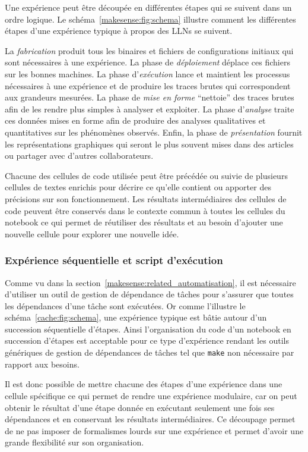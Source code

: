 Une expérience peut être découpée en différentes étapes qui se suivent dans un ordre logique.
Le schéma~\ref{makesense:fig:schema} illustre comment les différentes étapes d'une expérience typique à propos des \ac{LLN}s se suivent.

La \emph{fabrication} produit tous les binaires et fichiers de configurations initiaux qui sont nécessaires à une expérience.
La phase de \emph{déploiement} déplace ces fichiers sur les bonnes machines.
La phase d'\emph{exécution} lance et maintient les processus nécessaires à une expérience et de produire les traces brutes qui correspondent aux grandeurs mesurées.
La phase de \emph{mise en forme} ``nettoie'' des traces brutes afin de les rendre plus simples à analyser et exploiter.
La phase d'\emph{analyse} traite ces données mises en forme afin de produire des analyses qualitatives et quantitatives sur les phénomènes observés.
Enfin, la phase de \emph{présentation} fournit les représentations graphiques qui seront le plus souvent mises dans des articles ou partager avec d'autres collaborateurs.

Chacune des cellules de code utilisée peut être précédée ou suivie de plusieurs cellules de textes enrichis pour décrire ce qu'elle contient ou apporter des précisions sur son fonctionnement.
Les résultats intermédiaires des cellules de code peuvent être conservés dans le contexte commun à toutes les cellules du notebook ce qui permet de réutiliser des résultats et au besoin d'ajouter une nouvelle cellule pour explorer une nouvelle idée.

\subsubsection{Expérience séquentielle et script d'exécution}
\label{makesense:sequentiel}

Comme vu dans la section~\ref{makesense:related_automatisation}, il est nécessaire d'utiliser un outil de gestion de dépendance de tâches pour s'assurer que toutes les dépendances d'une tâche sont exécutées.
Or comme l'illustre le schéma~\ref{cache:fig:schema}, une expérience typique est bâtie autour d'un succession séquentielle d'étapes.
Ainsi l'organisation du code d'un notebook en succession d'étapes est acceptable pour ce type d'expérience rendant les outils génériques de gestion de dépendances de tâches tel que \texttt{make} non nécessaire par rapport aux besoins.

Il est donc possible de mettre chacune des étapes d'une expérience dans une cellule spécifique ce qui permet de rendre une expérience modulaire, car on peut obtenir le résultat d'une étape donnée en exécutant seulement une fois ses dépendances et en conservant les résultats intermédiaires.
Ce découpage permet de ne pas imposer de formalismes lourds sur une expérience et permet d'avoir une grande flexibilité sur son organisation.

